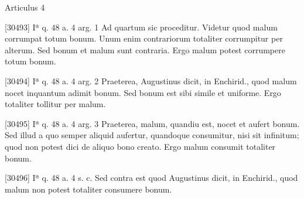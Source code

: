 \documentclass[10pt]{jsarticle} %
\begin{document}
Articulus 4

[30493] Iª q. 48 a. 4 arg. 1 Ad quartum sic proceditur. Videtur quod malum corrumpat totum bonum. Unum enim contrariorum totaliter corrumpitur per alterum. Sed bonum et malum sunt contraria. Ergo malum potest corrumpere totum bonum.

[30494] Iª q. 48 a. 4 arg. 2 Praeterea, Augustinus dicit, in Enchirid., quod malum nocet inquantum adimit bonum. Sed bonum est sibi simile et uniforme. Ergo totaliter tollitur per malum.

[30495] Iª q. 48 a. 4 arg. 3 Praeterea, malum, quandiu est, nocet et aufert bonum. Sed illud a quo semper aliquid aufertur, quandoque consumitur, nisi sit infinitum; quod non potest dici de aliquo bono creato. Ergo malum consumit totaliter bonum.

[30496] Iª q. 48 a. 4 s. c. Sed contra est quod Augustinus dicit, in Enchirid., quod malum non potest totaliter consumere bonum.
\end{document}
